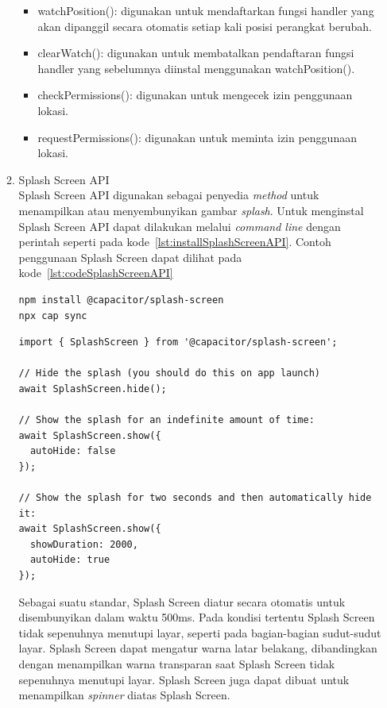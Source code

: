 \begin{enumerate}
\begin{enumerate}
			\begin{itemize}
				\item watchPosition(): digunakan untuk mendaftarkan fungsi handler yang akan dipanggil secara otomatis setiap kali posisi perangkat berubah.
				\item clearWatch(): digunakan untuk membatalkan pendaftaran fungsi handler yang sebelumnya diinstal menggunakan watchPosition().
				\item checkPermissions(): digunakan untuk mengecek izin penggunaan lokasi.
				\item requestPermissions(): digunakan untuk meminta izin penggunaan lokasi.
			\end{itemize}
			\item Splash Screen API	\\
			Splash Screen API digunakan sebagai penyedia \textit{method} untuk menampilkan atau menyembunyikan gambar \textit{splash}. Untuk menginstal Splash Screen API dapat dilakukan melalui \textit{command line} dengan perintah seperti pada kode~\ref{lst:installSplashScreenAPI}. Contoh penggunaan Splash Screen dapat dilihat pada kode~\ref{lst:codeSplashScreenAPI}
\begin{lstlisting}[label={lst:installSplashScreenAPI}, caption=Kode untuk Menginstal Splash Screen API]
npm install @capacitor/splash-screen
npx cap sync
\end{lstlisting}

\begin{lstlisting}[label={lst:codeSplashScreenAPI}, caption=Contoh Kode Penggunaan Splash Screen API]
import { SplashScreen } from '@capacitor/splash-screen';

// Hide the splash (you should do this on app launch)
await SplashScreen.hide();

// Show the splash for an indefinite amount of time:
await SplashScreen.show({
  autoHide: false
});

// Show the splash for two seconds and then automatically hide it:
await SplashScreen.show({
  showDuration: 2000,
  autoHide: true
});
\end{lstlisting}
			\newpage
			Sebagai suatu standar, Splash Screen diatur secara otomatis untuk disembunyikan dalam waktu 500ms. Pada kondisi tertentu Splash Screen tidak sepenuhnya menutupi layar, seperti pada bagian-bagian sudut-sudut layar. Splash Screen dapat mengatur warna latar belakang, dibandingkan dengan menampilkan warna transparan saat Splash Screen tidak sepenuhnya menutupi layar. Splash Screen juga dapat dibuat untuk menampilkan \textit{spinner} diatas Splash Screen. 
		

\end{enumerate}
\end{enumerate}
